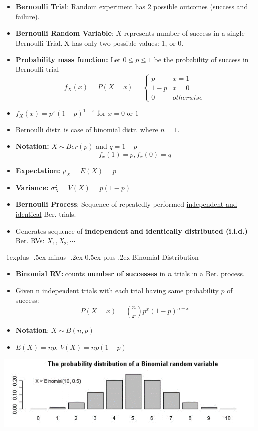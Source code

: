 \documentclass[12pt, landscape]{article}
\makeatletter
\renewcommand{\subsection}{\@startsection{subsection}{2}{0.1mm}%
                                {-1explus -.5ex minus -.2ex}%
                                {0.5ex plus .2ex}%
                                {\normalfont\normalsize\bfseries}}
\makeatother
\begin{document}
\begin{multicols*}{3}
\begin{itemize}
    \item \textbf{Bernoulli Trial}: Random experiment has 2 possible outcomes (success and failure).
    \item \textbf{Bernoulli Random Variable}: $X$ represents number of success in a single Bernoulli Trial. X has only two possible values: 1, or 0.
    \item \textbf{Probability mass function:} Let $0 \leq p \leq 1$ be the probability of success in Bernoulli trial
    \[ f_X (x) = P(X = x) = 
    \begin{cases}
        p & x = 1\\
        1 - p & x = 0\\
        0 & otherwise
    \end{cases}
    \]
    \item $f_X (x) = p^x (1-p)^{1-x}$ for $x=0$ or $1$
    \item Bernoulli distr. is case of binomial distr. where $n = 1$.
    \item \textbf{Notation:} $X \sim Ber(p)$ and $q = 1 - p$ \\
    \[ f_x(1) = p, f_x(0) = q \]
    \item \textbf{Expectation:} $\mu_X = E(X) = p$ 
    \item \textbf{Variance:} $\sigma_X^2 = V(X) = p(1-p)$
    
    \item \textbf{Bernoulli Process}: Sequence of repeatedly performed \underline{independent and identical} Ber. trials.
    \item Generates sequence of \textbf{independent and identically distributed (i.i.d.)} Ber. RVs: $X_1, X_2, \cdots$
\end{itemize}

\columnbreak

\subsection{Binomial Distribution}
\begin{itemize}
    \item \textbf{Binomial RV:} counts \textbf{number of successes} in $n$ trials in a Ber. process.
    \item Given n independent trials with each trial having same probability $p$ of success: 
    \[P(X = x) = \binom{n}{x} p^x (1-p)^{n-x}\]
    \item \textbf{Notation}: $X \sim B(n, p)$
    \item $E(X) = np$, $V(X) = np(1-p)$
\end{itemize}
\medskip
\centerline{\includegraphics[width=1\linewidth]{binomial}}


\end{multicols*}
\end{document}
